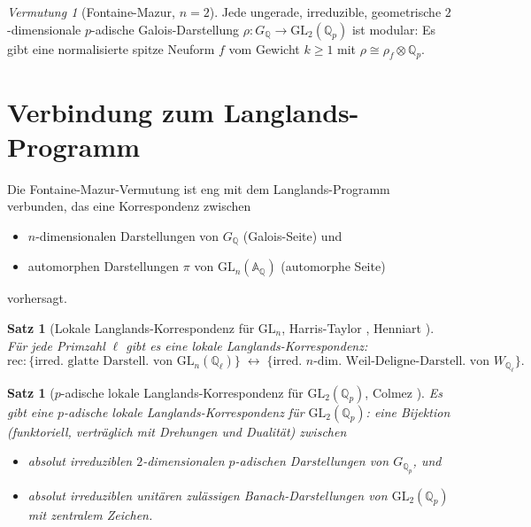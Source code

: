 \documentclass[12pt,a4paper]{amsart}
\newtheorem{satz}[theorem]{Satz}
\theoremstyle{definition}
\theoremstyle{remark}
\newtheorem{vermutung}[theorem]{Vermutung}
\newcommand{\GL}{\mathrm{GL}}
\newcommand{\Qp}{\mathbb{Q}_p}
\newcommand{\GQ}{G_{\mathbb{Q}}}
\newcommand{\rec}{\mathrm{rec}}
\newcommand{\Q}{\mathbb{Q}}
\begin{document}
\begin{vermutung}[Fontaine-Mazur, $n=2$]\label{verm:FM2}
  Jede ungerade, irreduzible, geometrische $2$-dimensionale $p$-adische Galois-Darstellung
  $\rho\colon \GQ \to \GL_2(\Qp)$
  ist modular: Es gibt eine normalisierte spitze Neuform $f$ vom Gewicht $k \geq 1$ mit
  $\rho \cong \rho_f \otimes \Qp$.
\end{vermutung}

\section{Verbindung zum Langlands-Programm}\label{sec:langlands}

Die Fontaine-Mazur-Vermutung ist eng mit dem Langlands-Programm verbunden, das eine
Korrespondenz zwischen
\begin{itemize}
  \item $n$-dimensionalen Darstellungen von $\GQ$ (Galois-Seite) und
  \item automorphen Darstellungen $\pi$ von $\GL_n(\mathbb{A}_\Q)$ (automorphe Seite)
\end{itemize}
vorhersagt.

\begin{satz}[Lokale Langlands-Korrespondenz für $\GL_n$, Harris-Taylor \cite{HT2001},
  Henniart \cite{Henniart2000}]
  Für jede Primzahl $\ell$ gibt es eine lokale Langlands-Korrespondenz:
  \[
    \rec \colon \{ \text{irred.\ glatte Darstell.\ von } \GL_n(\Q_\ell) \}
    \;\longleftrightarrow\;
    \{ \text{irred.\ $n$-dim.\ Weil-Deligne-Darstell.\ von } W_{\Q_\ell} \}.
  \]
\end{satz}

\begin{satz}[$p$-adische lokale Langlands-Korrespondenz für $\GL_2(\Qp)$,
  Colmez \cite{Colmez2010}]
  Es gibt eine $p$-adische lokale Langlands-Korrespondenz für $\GL_2(\Qp)$:
  eine Bijektion (funktoriell, verträglich mit Drehungen und Dualität) zwischen
  \begin{itemize}
    \item absolut irreduziblen $2$-dimensionalen $p$-adischen Darstellungen von
      $G_{\Qp}$, und
    \item absolut irreduziblen unitären zulässigen Banach-Darstellungen von
      $\GL_2(\Qp)$ mit zentralem Zeichen.
  \end{itemize}
\end{satz}
\end{document}
